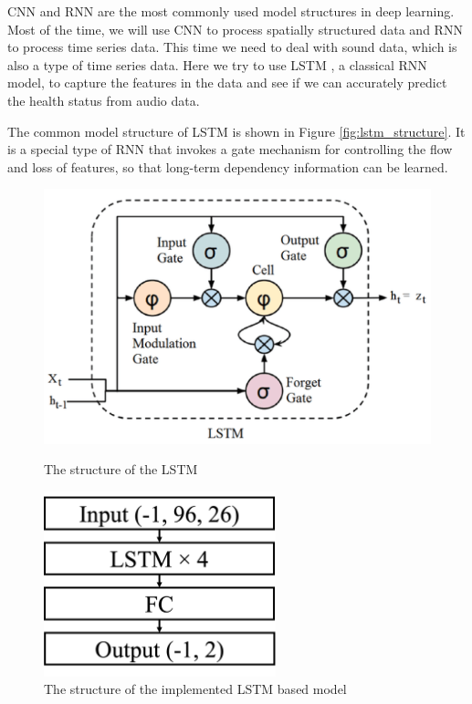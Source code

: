 \documentclass[11pt]{article}
\begin{document}
CNN and RNN are the most commonly used model structures in deep learning. Most of the time, we will use CNN to process spatially structured data and RNN to process time series data. This time we need to deal with sound data, which is also a type of time series data. Here we try to use LSTM \cite{hochreiter1997lstm}, a classical RNN model, to capture the features in the data and see if we can accurately predict the health status from audio data.

The common model structure of LSTM is shown in Figure \ref{fig:lstm_structure}. It is a special type of RNN that invokes a gate mechanism for controlling the flow and loss of features, so that long-term dependency information can be learned.

\begin{figure}[htbp]
	\centering
	\begin{minipage}[t]{0.48\textwidth}
		\centering
		\includegraphics[width=1.0\textwidth]{./imgs/lstm.png}
		\caption{The structure of the LSTM}
    	\label{fig:lstm_structure}
	\end{minipage}
	\begin{minipage}[t]{0.48\textwidth}
		\centering
		\includegraphics[width=0.6\textwidth]{./imgs/implemented_lstm.png}
		\caption{The structure of the implemented LSTM based model}
    	\label{fig:implemented_lstm_based_structure}
	\end{minipage}
\end{figure}
\end{document}
